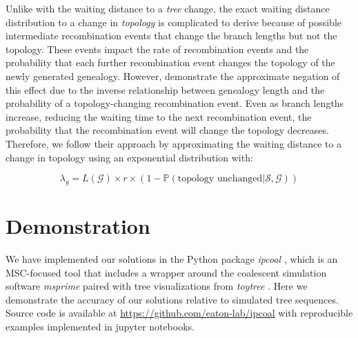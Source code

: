 \documentclass[11pt]{article}
\begin{document}
Unlike with the waiting distance to a \emph{tree} change, the exact waiting distance 
distribution to a change in \emph{topology} is complicated to derive because of 
possible intermediate recombination events that change the branch lengths but not 
the topology. These events impact the rate of recombination events and the probability
that each further recombination event changes the topology of the newly generated 
genealogy. However, \citet{deng_distribution_2021} demonstrate the approximate 
negation of this effect due to the inverse relationship between genealogy length
and the probability of a topology-changing recombination event. Even as branch 
lengths increase, reducing the waiting time to the next recombination event, the
probability that the recombination event will change the topology decreases. 
Therefore, we follow their approach by approximating the waiting distance to
a change in topology using an exponential distribution with:


\begin{equation}
	\lambda_{g} = 
	L(\mathcal{G}) \times r \times 
	(1 - \mathbb{P}(\text{topology unchanged} | \mathcal{S},\mathcal{G}))
\end{equation}

\section{Demonstration}

We have implemented our solutions in the Python package \emph{ipcoal} 
\citep{mckenzie_ipcoal_2020}, which is an MSC-focused tool that includes
a wrapper around the coalescent simulation software \emph{msprime}
\citep{baumdicker_efficient_2022} paired with tree visualizations from
\emph{toytree} \citep{eaton_toytree_2020}. 
Here we demonstrate
the accuracy of our solutions relative to simulated tree sequences.
Source code is available at \url{https://github.com/eaton-lab/ipcoal}
with reproducible examples implemented in jupyter notebooks.
\end{document}
